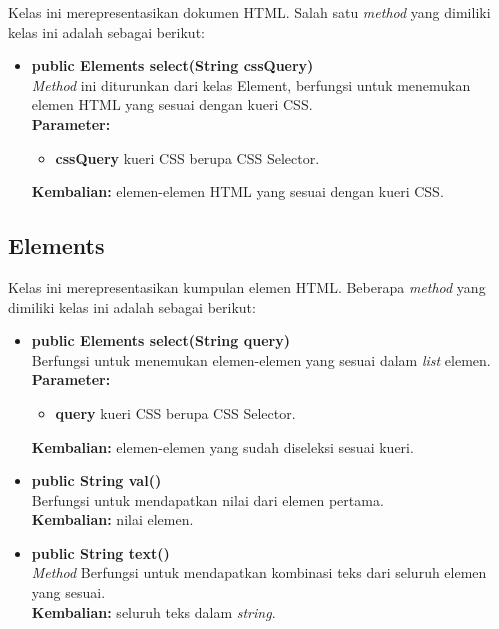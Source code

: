 Kelas ini merepresentasikan dokumen HTML. Salah satu \textit{method} yang dimiliki kelas ini adalah sebagai berikut:
\begin{itemize}
	\item \textbf{public Elements select(String cssQuery)} \\
		\textit{Method} ini diturunkan dari kelas Element, berfungsi untuk menemukan elemen HTML yang sesuai dengan kueri CSS. \\
		\textbf{Parameter:} 
		\begin{itemize}
			\item \textbf{cssQuery} kueri CSS berupa CSS Selector.
		\end{itemize}
		\textbf{Kembalian:} elemen-elemen HTML yang sesuai dengan kueri CSS.	
\end{itemize}

\subsection{Elements}

Kelas ini merepresentasikan kumpulan elemen HTML. Beberapa \textit{method} yang dimiliki kelas ini adalah sebagai berikut:
\begin{itemize}
	\item \textbf{public Elements select(String query)} \\
		Berfungsi untuk menemukan elemen-elemen yang sesuai dalam \textit{list} elemen. \\
		\textbf{Parameter:} 
		\begin{itemize}
			\item \textbf{query} kueri CSS berupa CSS Selector.
		\end{itemize}
		\textbf{Kembalian:} elemen-elemen yang sudah diseleksi sesuai kueri.	
		
		\item \textbf{public String val()} \\
		Berfungsi untuk mendapatkan nilai dari elemen pertama. \\
		\textbf{Kembalian:} nilai elemen.	
		
		\item \textbf{public String text()} \\
		\textit{Method} Berfungsi untuk mendapatkan kombinasi teks dari seluruh elemen yang sesuai. \\
		\textbf{Kembalian:} seluruh teks dalam \textit{string}.	
\end{itemize}

